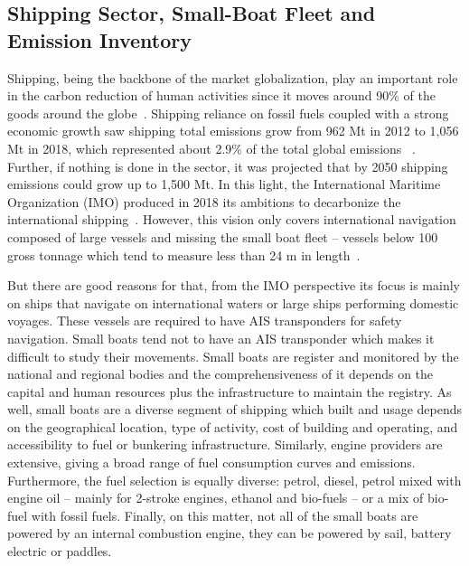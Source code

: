 \subsection{Shipping Sector, Small-Boat Fleet and Emission Inventory}
Shipping, being the backbone of the market globalization, play an important role in the carbon reduction of human activities since it moves around 90\% of the goods around the globe~\cite{walker2019environmental}. Shipping reliance on fossil fuels coupled with a strong economic growth saw shipping total  emissions grow from 962 Mt in 2012 to 1,056 Mt in 2018, which represented about 2.9\% of the total global emissions ~\cite{IMO2021Fourth}. Further, if nothing is done in the sector, it was projected that by 2050 shipping  emissions could grow up to 1,500 Mt. In this light, the International Maritime Organization (IMO) produced in 2018 its ambitions to decarbonize the international shipping~\cite{imo2018adoption}. However, this vision only covers international navigation composed of large vessels and missing the small boat fleet – vessels below 100 gross tonnage which tend to measure less than 24 m in length~\cite{uk2021Operational}.

But there are good reasons for that, from the IMO perspective its focus is mainly on ships that navigate on international waters or large ships performing domestic voyages. These vessels are required to have AIS transponders for safety navigation. Small boats tend not to have an AIS transponder which makes it difficult to study their movements. Small boats are register and monitored by the national and regional bodies and the comprehensiveness of it depends on the capital and human resources plus the infrastructure to maintain the registry. As well, small boats are a diverse segment of shipping which built and usage depends on the geographical location, type of activity, cost of building and operating, and accessibility to fuel or bunkering infrastructure. Similarly, engine providers are extensive, giving a broad range of fuel consumption curves and emissions. Furthermore, the fuel selection is equally diverse: petrol, diesel, petrol mixed with engine oil – mainly for 2-stroke engines, ethanol and bio-fuels – or a mix of bio-fuel with fossil fuels. Finally, on this matter, not all of the small boats are powered by an internal combustion engine, they can be powered by sail, battery electric or paddles.

